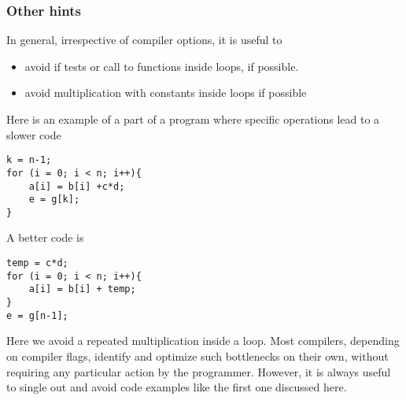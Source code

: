 \documentclass{beamer}
\begin{document}
\begin{frame}
\frametitle{Other hints}

\begin{block}{}
In general, irrespective of compiler options, it is useful to
\begin{itemize}
\item avoid if tests or call to functions inside loops, if possible. 

\item avoid multiplication with constants inside loops if possible
\end{itemize}

\noindent
Here is an example of a part of a program where specific operations lead to a slower code






\begin{verbatim}
k = n-1;
for (i = 0; i < n; i++){
    a[i] = b[i] +c*d;
    e = g[k];
}

\end{verbatim}

A better code is






\begin{verbatim}
temp = c*d;
for (i = 0; i < n; i++){
    a[i] = b[i] + temp;
}
e = g[n-1];

\end{verbatim}

Here we avoid a repeated multiplication inside a loop. 
Most compilers, depending on compiler flags, identify and optimize such bottlenecks on their own, without requiring any particular action by the programmer. However, it is always useful to single out and avoid code examples like the first one discussed here.
\end{block}
\end{frame}
\end{document}
